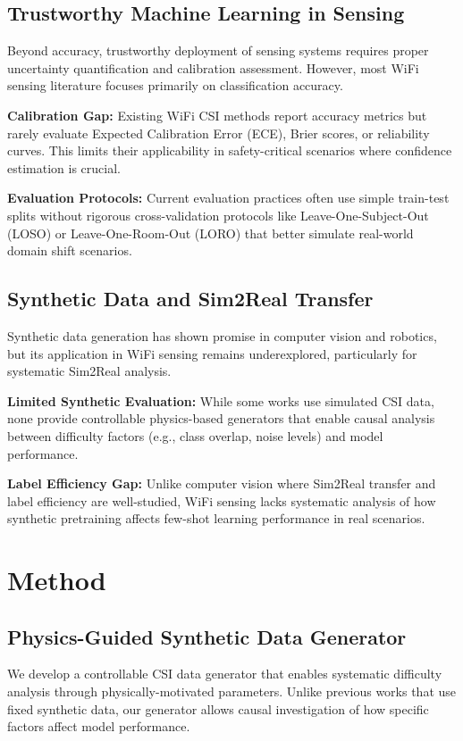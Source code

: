 \documentclass[10pt,conference]{IEEEtran}
\begin{document}
\subsection{Trustworthy Machine Learning in Sensing}
Beyond accuracy, trustworthy deployment of sensing systems requires proper uncertainty quantification and calibration assessment. However, most WiFi sensing literature focuses primarily on classification accuracy.

\textbf{Calibration Gap:} Existing WiFi CSI methods \cite{rewis2022, autofi2022, gaitfi2022} report accuracy metrics but rarely evaluate Expected Calibration Error (ECE), Brier scores, or reliability curves. This limits their applicability in safety-critical scenarios where confidence estimation is crucial.

\textbf{Evaluation Protocols:} Current evaluation practices often use simple train-test splits without rigorous cross-validation protocols like Leave-One-Subject-Out (LOSO) or Leave-One-Room-Out (LORO) that better simulate real-world domain shift scenarios.

\subsection{Synthetic Data and Sim2Real Transfer}
Synthetic data generation has shown promise in computer vision and robotics, but its application in WiFi sensing remains underexplored, particularly for systematic Sim2Real analysis.

\textbf{Limited Synthetic Evaluation:} While some works use simulated CSI data, none provide controllable physics-based generators that enable causal analysis between difficulty factors (e.g., class overlap, noise levels) and model performance.

\textbf{Label Efficiency Gap:} Unlike computer vision where Sim2Real transfer and label efficiency are well-studied, WiFi sensing lacks systematic analysis of how synthetic pretraining affects few-shot learning performance in real scenarios.

\section{Method}

\subsection{Physics-Guided Synthetic Data Generator}
We develop a controllable CSI data generator that enables systematic difficulty analysis through physically-motivated parameters. Unlike previous works that use fixed synthetic data, our generator allows causal investigation of how specific factors affect model performance.
\end{document}
